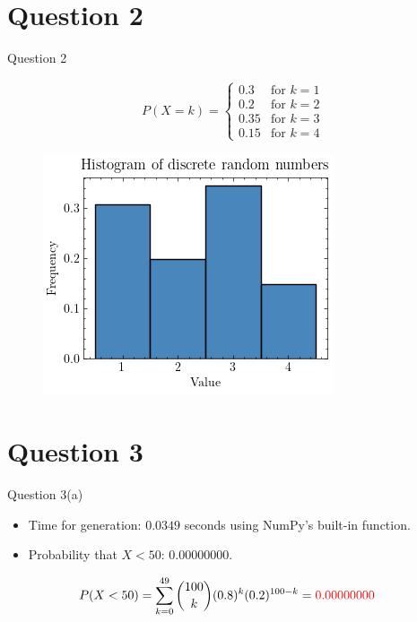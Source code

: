 \documentclass[compress,12pt]{beamer}
\begin{document}
\section{Question 2}
\begin{frame}{Question 2}

\begin{align*}
      P(X = k) = \begin{cases}
            0.3 & \text{for } k = 1 \\
            0.2 & \text{for } k = 2 \\
            0.35 & \text{for } k = 3 \\
            0.15 & \text{for } k = 4
      \end{cases}
\end{align*}

      \begin{figure}
            \centering
            \includegraphics[scale=0.6]{imgs/discrete.png}
      \end{figure}
      
\end{frame}

\section{Question 3}
\begin{frame}{Question 3(a)}
     \begin{itemize}
         \item Time for generation: $0.0349$ seconds using NumPy's built-in function.
         \item Probability that $X < 50$: $0.00000000$.
     \end{itemize}
        \begin{align*}
                P(X < 50) &= \sum_{k=0}^{49} {100 \choose k} (0.8)^k (0.2)^{100-k} = {\color{red}0.00000000}
        \end{align*}
      
\end{frame}
\end{document}
